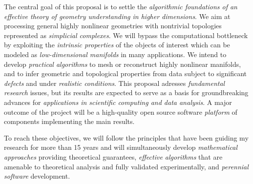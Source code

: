 \documentclass[a4paper, 11pt]{article}
\begin{document}
The central goal of this proposal is to settle the {\em algorithmic
foundations of an effective theory of geometry understanding in higher
dimensions}.  We aim at processing general highly nonlinear geometries
with nontrivial topologies represented as
{\em simplicial complexes}. We will bypass the computational bottleneck 
by exploiting the {\em intrinsic properties} of the objects of
interest which can be modeled as {\em low-dimensional manifolds} in
many applications. We
intend to develop {\em practical algorithms} to mesh or reconstruct
highly nonlinear manifolds, and to infer geometric and topological
properties from data subject to significant {\em defects} and under
{\em realistic conditions}. This proposal adresses {\em fundamental
  research} issues, but its results are expected to serve as a basis
for groundbreaking advances for {\em applications in scientific computing
and data analysis}.  A major outcome of the project will be a
high-quality open source software {\em platform} of components
implementing the main results.

To reach these objectives, we will follow the principles that have been
guiding my research for more than 15 years and will simultaneously
develop {\em mathematical approaches} providing theoretical
guarantees, {\em effective algorithms} that are amenable to
theoretical analysis and fully validated experimentally, and {\em
  perennial software} development.



\newpage


\end{document}
